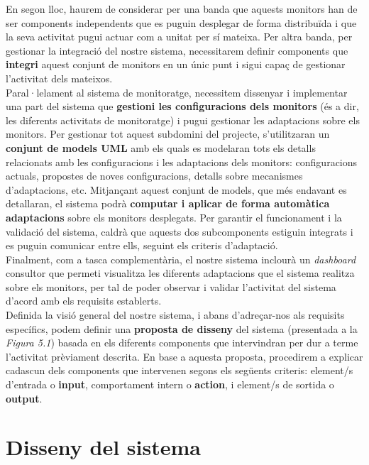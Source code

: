 En segon lloc, haurem de considerar per una banda que aquests monitors han de ser components independents que es puguin desplegar de forma distribuïda i que la seva activitat pugui actuar com a unitat per sí mateixa. Per altra banda, per gestionar la integració del nostre sistema, necessitarem definir components que \textbf{integri} aquest conjunt de monitors en un únic punt i sigui capaç de gestionar l'activitat dels mateixos.\\

Paral·lelament al sistema de monitoratge, necessitem dissenyar i implementar una part del sistema que \textbf{gestioni les configuracions dels monitors} (és a dir, les diferents activitats de monitoratge) i pugui gestionar les adaptacions sobre els monitors. Per gestionar tot aquest subdomini del projecte, s'utilitzaran un \textbf{conjunt de models UML} amb els quals es modelaran tots els detalls relacionats amb les configuracions i les adaptacions dels monitors: configuracions actuals, propostes de noves configuracions, detalls sobre mecanismes d'adaptacions, etc. Mitjançant aquest conjunt de models, que més endavant es detallaran, el sistema podrà \textbf{computar i aplicar de forma automàtica adaptacions} sobre els monitors desplegats. Per garantir el funcionament i la validació del sistema, caldrà que aquests dos subcomponents estiguin integrats i es puguin comunicar entre ells, seguint els criteris d'adaptació.\\

Finalment, com a tasca complementària, el nostre sistema inclourà un \textit{dashboard} consultor que permeti visualitza les diferents adaptacions que el sistema realitza sobre els monitors, per tal de poder observar i validar l'activitat del sistema d'acord amb els requisits establerts.\\

Definida la visió general del nostre sistema, i abans d'adreçar-nos als requisits específics, podem definir una \textbf{proposta de disseny} del sistema (presentada a la \textit{Figura 5.1}) basada en els diferents components que intervindran per dur a terme l'activitat prèviament descrita. En base a aquesta proposta, procedirem a explicar cadascun dels components que intervenen segons els següents criteris: element/s d'entrada o \textbf{input}, comportament intern o \textbf{action}, i element/s de sortida o \textbf{output}.\\

\section{Disseny del sistema}


